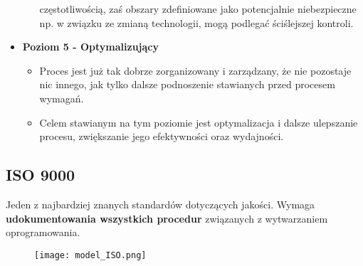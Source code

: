 \documentclass[a4paper]{article}
\begin{document}
\begin{itemize}
\begin{itemize}
            częstotliwością, zaś obszary zdefiniowane jako
            potencjalnie niebezpieczne np. w związku ze zmianą
            technologii, mogą podlegać ściślejszej kontroli.
        \end{itemize}
        \item \textbf{Poziom 5 - Optymalizujący}
        \begin{itemize}
            \item Proces jest już tak dobrze zorganizowany i zarządzany, że
            nie pozostaje nic innego, jak tylko dalsze podnoszenie
            stawianych przed procesem wymagań.
            \item Celem stawianym na tym poziomie jest optymalizacja i
            dalsze ulepszanie procesu, zwiększanie jego
            efektywności oraz wydajności.
        \end{itemize}
    \end{itemize}


    \subsection{ISO 9000}
    Jeden z najbardziej znanych standardów dotyczących jakości. Wymaga \textbf{udokumentowania wszystkich procedur} związanych z wytwarzaniem oprogramowania.

    \begin{figure}[H]
        \texttt{[image: model\_ISO.png]}
    \end{figure}
\end{document}
